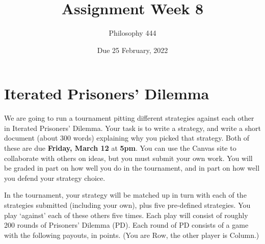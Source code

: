 \documentclass[
  11pt,
]{article}
\title{Assignment Week 8}
\author{Philosophy 444}
\date{Due 25 February, 2022}
\begin{document}
\maketitle

\hypertarget{iterated-prisoners-dilemma}{%
\section{Iterated Prisoners' Dilemma}\label{iterated-prisoners-dilemma}}

We are going to run a tournament pitting different strategies against
each other in Iterated Prisoners' Dilemma. Your task is to write a
strategy, and write a short document (about 300 words) explaining why
you picked that strategy. Both of these are due \textbf{Friday, March
12} at \textbf{5pm}. You can use the Canvas site to collaborate with
others on ideas, but you must submit your own work. You will be graded
in part on how well you do in the tournament, and in part on how well
you defend your strategy choice.

In the tournament, your strategy will be matched up in turn with each of
the strategies submitted (including your own), plus five pre-defined
strategies. You play `against' each of these others five times. Each
play will consist of roughly 200 rounds of Prisoners' Dilemma (PD). Each
round of PD consists of a game with the following payouts, in points.
(You are Row, the other player is Column.)

 
  \providecommand{\huxb}[2]{\arrayrulecolor[RGB]{#1}\global\arrayrulewidth=#2pt}
  \providecommand{\huxvb}[2]{\color[RGB]{#1}\vrule width #2pt}
  \providecommand{\huxtpad}[1]{\rule{0pt}{#1}}
  \providecommand{\huxbpad}[1]{\rule[-#1]{0pt}{#1}}
\end{document}
